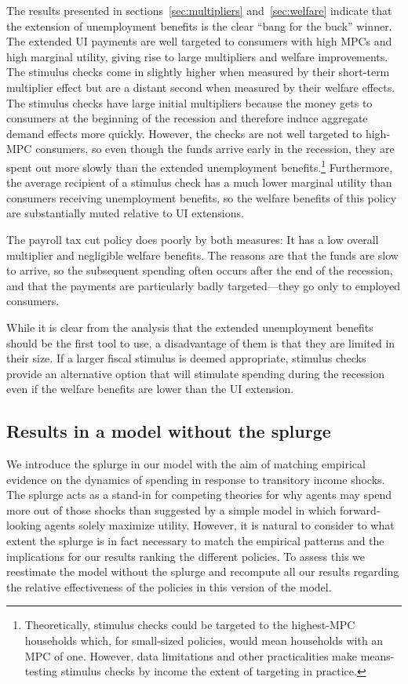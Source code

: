 \documentclass[\latexroot/\projectname]{subfiles}
\begin{document}
The results presented in sections~\ref{sec:multipliers} and~\ref{sec:welfare} indicate that the extension of unemployment benefits is the clear ``bang for the buck'' winner.
The extended UI payments are well targeted to consumers with high MPCs and high marginal utility, giving rise to large multipliers and welfare improvements.
The stimulus checks come in slightly higher when measured by their short-term multiplier effect but are a distant second when measured by their welfare effects.
The stimulus checks have large initial multipliers because the money gets to consumers at the beginning of the recession and therefore induce aggregate demand effects more quickly.
However, the checks are not well targeted to high-MPC consumers, so even though the funds arrive early in the recession, they are spent out more slowly than the extended unemployment benefits.\footnote{Theoretically, stimulus checks could be targeted to the highest-MPC households which, for small-sized policies, would mean households with an MPC of one.
  However, data limitations and other practicalities make means-testing stimulus checks by income the extent of targeting in practice.} Furthermore, the average recipient of a stimulus check has a much lower marginal utility than consumers receiving unemployment benefits, so the welfare benefits of this policy are substantially muted relative to UI extensions.

The payroll tax cut policy does poorly by both measures: It has a low overall multiplier and negligible welfare benefits.
The reasons are that the funds are slow to arrive, so the subsequent spending often occurs after the end of the recession, and that the payments are particularly badly targeted---they go only to employed consumers.

While it is clear from the analysis that the extended unemployment benefits should be the first tool to use, a disadvantage of them is that they are limited in their size.
If a larger fiscal stimulus is deemed appropriate, stimulus checks provide an alternative option that will stimulate spending during the recession even if the welfare benefits are lower than the UI extension.

\FloatBarrier
\subsection{Results in a model without the splurge}

We introduce the splurge in our model with the aim of matching empirical evidence on the dynamics of spending in response to transitory income shocks.
The splurge acts as a stand-in for competing theories for why agents may spend more out of those shocks than suggested by a simple model in which forward-looking agents solely maximize utility.
However, it is natural to consider to what extent the splurge is in fact necessary to match the empirical patterns and the implications for our results ranking the different policies.
To assess this we  reestimate the model without the splurge and recompute all our results regarding the relative effectiveness of the policies in this version of the model.
\end{document}
